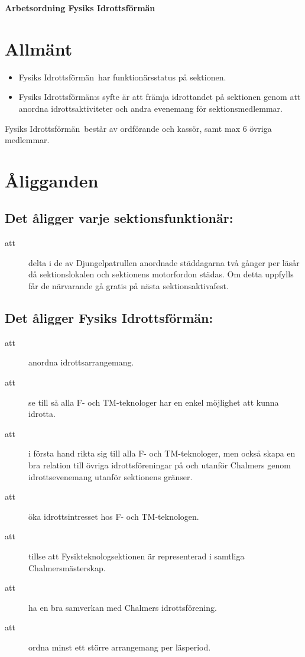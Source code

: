 \renewcommand{\dateseparator}{-} %

\renewcommand{\forening}{Fysiks Idrottsförmän}


\begin{center}
\LARGE{\textbf{Arbetsordning \forening}}
\end{center}


\section{Allmänt}
\begin{itemize}
\item \forening \ har funktionärsstatus på sektionen.
\item \forening:s syfte är att främja idrottandet på sektionen genom att anordna idrottsaktiviteter och andra evenemang för sektionsmedlemmar.

\end{itemize}

\forening \ består av ordförande och kassör, samt max 6 övriga medlemmar.

\section{Åligganden}
\subsection{Det åligger varje sektionsfunktionär:}
    \begin{description}
      \item[att] delta i de av Djungelpatrullen anordnade städdagarna två gånger per
      läsår då sektionslokalen och sektionens motorfordon städas. Om detta uppfylls får de närvarande gå gratis på nästa
      sektionsaktivafest.
    \end{description}

\subsection{Det åligger \forening:}
    \begin{description}
      \item[att] anordna idrottsarrangemang.
      \item[att] se till så alla F- och TM-teknologer har en enkel möjlighet att kunna idrotta.
      \item[att] i första hand rikta sig till alla F- och TM-teknologer, men
      också skapa en bra relation till övriga idrottsföreningar på och
      utanför Chalmers genom idrottsevenemang utanför sektionens
      gränser.
      \item[att] öka idrottsintresset hos F- och TM-teknologen.
      \item[att] tillse att Fysikteknologsektionen är representerad i samtliga Chalmers\-mäst\-er\-skap.
      \item[att] ha en bra samverkan med Chalmers idrottsförening.
      \item[att] ordna minst ett större arrangemang per läsperiod.
    \end{description}


